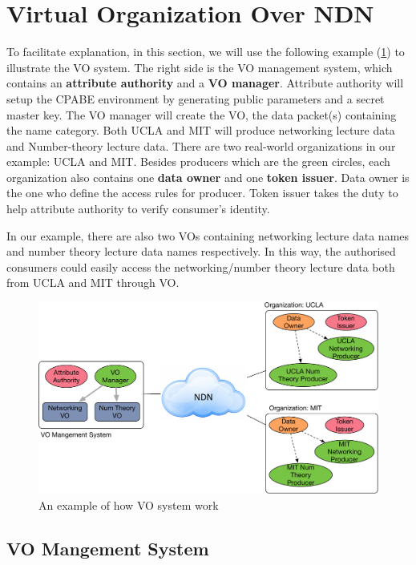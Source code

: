 \section{Virtual Organization Over NDN}

To facilitate explanation, in this section, we will use the following example (\ref{fig:example}) to illustrate the VO system.
The right side is the VO management system, which contains an \textbf{attribute authority} and a \textbf{VO manager}.
Attribute authority will setup the CPABE environment by generating public parameters and a secret master key.
The VO manager will create the VO, the data packet(s) containing the name category.
Both UCLA and MIT will produce networking lecture data and Number-theory lecture data.
There are two real-world organizations in our example: UCLA and MIT.
Besides producers which are the green circles, each organization also contains one \textbf{data owner} and one \textbf{token issuer}.
Data owner is the one who define the access rules for producer.
Token issuer takes the duty to help attribute authority to verify consumer's identity.

In our example, there are also two VOs containing networking lecture data names and number theory lecture data names respectively.
In this way, the authorised consumers could easily access the networking/number theory lecture data both from UCLA and MIT through VO.

\begin{figure}[t]
  \centering
  \includegraphics[scale=0.5]{figures/example}
  \vspace{-3mm}
  \caption{An example of how VO system work}
  \label{fig:example}
\end{figure}

\subsection{VO Mangement System}

